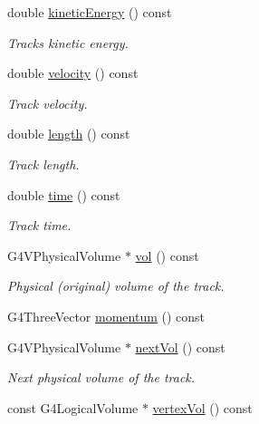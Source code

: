 \begin{DoxyCompactItemize}
double \hyperlink{class_d_d4hep_1_1_simulation_1_1_geant4_track_handler_a4e4e1b38fb592e189ac303a6ef19f0cf}{kinetic\+Energy} () const
\begin{DoxyCompactList}\small\item\em Track\textquotesingle{}s kinetic energy. \end{DoxyCompactList}\item 
double \hyperlink{class_d_d4hep_1_1_simulation_1_1_geant4_track_handler_aa190c53d0eebac9b69ec9112b6c23492}{velocity} () const
\begin{DoxyCompactList}\small\item\em Track velocity. \end{DoxyCompactList}\item 
double \hyperlink{class_d_d4hep_1_1_simulation_1_1_geant4_track_handler_af2567747abef792c86729878fdecfe4d}{length} () const
\begin{DoxyCompactList}\small\item\em Track length. \end{DoxyCompactList}\item 
double \hyperlink{class_d_d4hep_1_1_simulation_1_1_geant4_track_handler_aaa1df8165c645a9aae1f959d77a191ce}{time} () const
\begin{DoxyCompactList}\small\item\em Track time. \end{DoxyCompactList}\item 
G4\+V\+Physical\+Volume $\ast$ \hyperlink{class_d_d4hep_1_1_simulation_1_1_geant4_track_handler_a454676baecb2ae344dcf491ba8a15090}{vol} () const
\begin{DoxyCompactList}\small\item\em Physical (original) volume of the track. \end{DoxyCompactList}\item 
G4\+Three\+Vector \hyperlink{class_d_d4hep_1_1_simulation_1_1_geant4_track_handler_af184b1eae4fe7d2da7d9579922514d1b}{momentum} () const
\item 
G4\+V\+Physical\+Volume $\ast$ \hyperlink{class_d_d4hep_1_1_simulation_1_1_geant4_track_handler_ad00d99a8dbf18835de9b4cc52a50061b}{next\+Vol} () const
\begin{DoxyCompactList}\small\item\em Next physical volume of the track. \end{DoxyCompactList}\item 
const G4\+Logical\+Volume $\ast$ \hyperlink{class_d_d4hep_1_1_simulation_1_1_geant4_track_handler_a9a21433f606d817747006d54d3d9ef74}{vertex\+Vol} () const

\end{DoxyCompactItemize}
